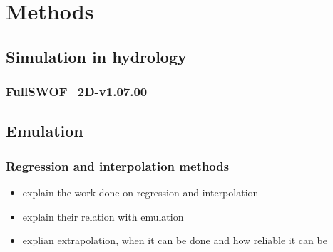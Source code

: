 \chapter{Methods}
\label{chp:methods}

\section{Simulation in hydrology}


\subsection{FullSWOF\_2D-v1.07.00}


\section{Emulation}


\subsection{Regression and interpolation methods}

\begin{itemize}
\itemsep0em
  \item explain the work done on regression and interpolation
  \item explain their relation with emulation
  \item explian extrapolation, when it can be done and how reliable it can be
\end{itemize}


